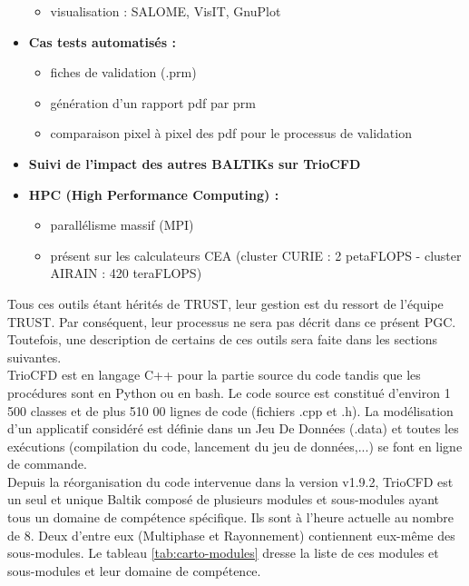 \begin{itemize}[label=$\Rightarrow$, font=\LARGE]
\begin{itemize}
    \item visualisation : SALOME, VisIT, GnuPlot
  \end{itemize}
  \item \textbf{Cas tests automatisés :}
  \begin{itemize}
    \item fiches de validation (.prm)
    \item g\'en\'eration d'un rapport pdf par prm
    \item comparaison pixel \`a pixel des pdf pour le processus de validation
  \end{itemize}
  \item \textbf{Suivi de l'impact des autres BALTIKs sur TrioCFD}
  \item \textbf{HPC (High Performance Computing) :}
  \begin{itemize}
    \item parallélisme massif (MPI)
    \item pr\'esent sur les calculateurs CEA (cluster CURIE : 2 petaFLOPS - cluster AIRAIN : 420 teraFLOPS)
  \end{itemize}
\end{itemize}\smallskip

Tous ces outils \'etant h\'erit\'es de TRUST, leur gestion est du ressort de l'\'equipe TRUST.
Par cons\'equent, leur processus ne sera pas d\'ecrit dans ce pr\'esent PGC. Toutefois, une description de certains de ces outils sera faite dans les sections suivantes.\\
TrioCFD est en langage C++ pour la partie source du code tandis que les proc\'edures sont en Python ou en bash.
Le code source est constitu\'e d'environ 1 500 classes et de plus 510 00 lignes de code (fichiers .cpp et .h).
La mod\'elisation d'un applicatif consid\'er\'e est d\'efinie dans un Jeu De Donn\'ees (.data)
et toutes les ex\'ecutions (compilation du code, lancement du jeu de donn\'ees,...) se font en ligne de commande. \smallskip\\

Depuis la r\'eorganisation du code intervenue dans la version v1.9.2, TrioCFD est un seul et unique Baltik
compos\'e de plusieurs modules et sous-modules ayant tous un domaine de comp\'etence sp\'ecifique.
Ils sont \`a l'heure actuelle au nombre de 8.
Deux d'entre eux (Multiphase et Rayonnement) contiennent eux-m\^eme des sous-modules.
Le tableau \ref{tab:carto-modules} dresse la liste de ces modules et sous-modules et leur domaine de comp\'etence.


